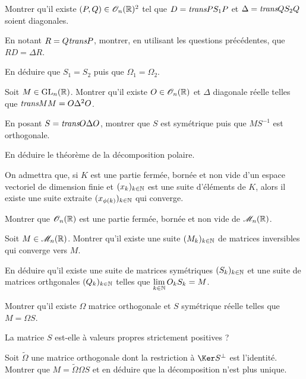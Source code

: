 Montrer qu'il existe $(P, Q) \in \mathscr{O}_n(\mathbb{R})^2$ tel que $D = \textit{trans}{P} S_1 P$ et $\Delta = \textit{trans}{Q} S_2 Q$ soient diagonales.

En notant $R = Q \textit{trans}{P}$, montrer, en utilisant les questions précédentes, que $R D = \Delta R$.

En déduire que $S_1 = S_2$ puis que $\Omega_1 = \Omega_2$.

Soit $M \in \mathrm{GL}_n(\mathbb{R})$.
Montrer qu'il existe $O \in \mathscr{O}_n(\mathbb{R})$ et $\Delta$ diagonale réelle telles que $\textit{trans}{M} M = O \Delta^2 O$.

En posant $S = \textit{trans}{O} \Delta O$, montrer que $S$ est symétrique puis que $M S^{-1}$ est orthogonale.

En déduire le théorème de la décomposition polaire.




\medskip

On admettra que, si $K$ est une partie fermée, bornée et non vide d'un espace vectoriel de dimension finie et $(x_k)_{k\in\mathbb{N}}$ est une suite d'éléments de $K$, alors il existe une suite extraite $(x_{\phi(k)})_{k\in\mathbb{N}}$ qui converge.

Montrer que $\mathscr{O}_n(\mathbb{R})$ est une partie fermée, bornée et non vide de $\mathscr{M}_n(\mathbb{R})$.

Soit $M \in \mathscr{M}_n(\mathbb{R})$.
Montrer qu'il existe une suite $(M_k)_{k\in\mathbb{N}}$ de matrices inversibles qui converge vers $M$.

En déduire qu'il existe une suite de matrices symétriques $(S_k)_{k\in\mathbb{N}}$ et une suite de matrices orthgonales $(Q_k)_{k\in\mathbb{N}}$ telles que $\lim\limits_{k\in\mathbb{N}} O_k S_k = M$.

Montrer qu'il existe $\Omega$ matrice orthogonale et $S$ symétrique réelle telles que $M = \Omega S$.

La matrice $S$ est-elle à valeurs propres strictement positives ?

Soit $\tilde{\Omega}$ une matrice orthogonale dont la restriction à $\Ker S^\perp$ est l'identité. Montrer que $M = \tilde{\Omega} \Omega S$ et en déduire que la décomposition n'est plus unique.


